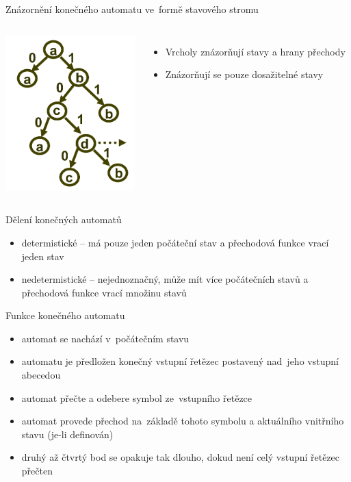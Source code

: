 \documentclass{beamer}
\begin{document}
\begin{frame}{Znázornění konečného automatu ve~formě stavového stromu}
  \begin{columns}
    \column{5cm}
      \includegraphics[width=5cm]{tree.PNG}
    \column{5cm}
      \begin{itemize}
        \item{Vrcholy znázorňují stavy a hrany přechody}
        \item{Znázorňují se pouze dosažitelné stavy}
      \end{itemize}
  \end{columns}
\end{frame}

\begin{frame}{Dělení konečných automatů}
  \begin{itemize}
  \item{determistické -- má pouze jeden počáteční stav a přechodová funkce vrací jeden stav}
  \pause
  \item{nedetermistické -- nejednoznačný, může mít více počátečních stavů a přechodová funkce vrací množinu stavů}
  \end{itemize}
\end{frame}


\begin{frame}{Funkce konečného automatu}
  \begin{itemize}
  \item{automat se nachází v~počátečním stavu}
  \item{automatu je předložen konečný vstupní řetězec postavený nad~jeho vstupní abecedou}
  \item{automat přečte a odebere symbol ze~vstupního řetězce}
  \item{automat provede přechod na~základě tohoto symbolu a aktuálního vnitřního stavu (je-li definován)}
  \item{druhý až čtvrtý bod se opakuje tak dlouho, dokud není celý vstupní řetězec přečten}
  \end{itemize}
\end{frame}
\end{document}
